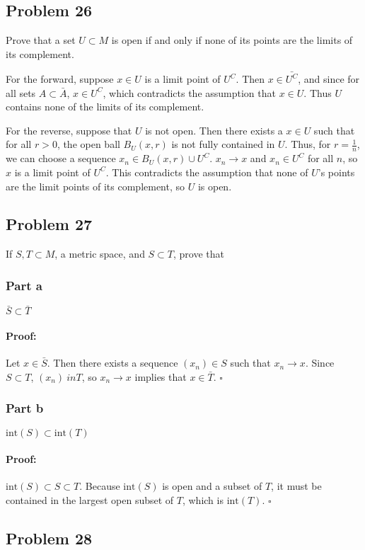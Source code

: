 \documentclass{article}
\newenvironment{proof}{\paragraph{Proof:}}{\hfill$\square$}
\begin{document}
\subsection*{Problem 26}
Prove that a set $U \subset M$ is open if and only if none of its points are the limits of its complement.

For the forward, suppose $x \in U$ is a limit point of $U^C$. Then $x \in \bar{U^C}$, and since for all sets $A \subset \bar{A}$, $x \in U^C$, which contradicts the assumption that $x \in U$. Thus $U$ contains none of the limits of its complement.

For the reverse, suppose that $U$ is not open. Then there exists a $x \in U$  such that for all $r > 0$, the open ball $B_U(x, r)$ is not fully contained in $U$. Thus, for $r = \frac{1}{n}$, we can choose a sequence $x_n \in B_U(x, r)\cup U^C$. $x_n \rightarrow x$ and $x_n \in U^C$ for all $n$, so $x$ is a limit point of $U^C$. This contradicts the assumption that none of $U$'s points are the limit points of its complement, so $U$ is open.

\subsection*{Problem 27}
If $S, T \subset M$, a metric space, and $S \subset T$, prove that
\subsubsection*{Part a}
$\bar{S} \subset \bar{T}$
\begin{proof}
Let $x \in \bar{S}$. Then there exists a sequence $(x_n) \in S$ such that $x_n \rightarrow x$. Since $S \subset T$, $(x_n) \ in T$, so $x_n \rightarrow x$ implies that $x \in \bar{T}$.
\end{proof}

\subsubsection*{Part b}
$\text{int}(S) \subset \text{int}(T)$
\begin{proof}
$\text{int}(S) \subset S \subset T$. Because $\text{int}(S)$ is open and a subset of $T$, it must be contained in the largest open subset of $T$, which is $\text{int}(T)$.
\end{proof}

\subsection*{Problem 28}
\end{document}
